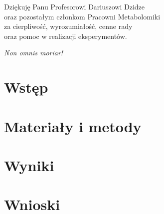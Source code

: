 \documentclass[12pt, a4paper]{article}
\begin{document}


\newpage
\thispagestyle{empty}
\tableofcontents

\newpage
\thispagestyle{empty}

\vspace*{3cm}
\begin{flushright}
    Dziękuję Panu Profesorowi Dariuszowi Dzidze\\
    oraz pozostałym członkom Pracowni Metabolomiki\\
    za cierpliwość, wyrozumiałość, cenne rady\\
    oraz pomoc w realizacji eksperymentów.
\end{flushright}
\vspace*{\fill}
\begin{flushleft}
    \textit{Non omnis moriar!}
\end{flushleft}

\newpage
\setcounter{page}{4}
\section{Wstęp}\label{sec:wstep}


\section{Materiały i metody}\label{sec:metody}


\section{Wyniki}\label{sec:wyniki}


\section{Wnioski}\label{sec:wnioski}


\thispagestyle{empty}



\newpage

\end{document}
